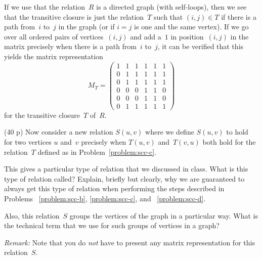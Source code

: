 \documentclass{jn-pset}
\begin{document}
\begin{problem}
\begin{solution}
    If we use that the relation~$R$ is a directed graph (with self-loops),
    then we see that the transitive closure is just the relation~$T$
    such that
    $(i, j) \in T$
    if there is a path from~$i$ to~$j$ in the graph
    (or if $i = j $ is one and the same vertex).
    If we go over all ordered pairs of vertices~$(i,j)$
    and add a~$1$ in position~$(i,j)$ in the matrix
    precisely when there is a path from~$i$ to~$j$, it can be verified that this yields the
    matrix representation
  \begin{equation}
    \label{eq:adjacency-matrix-transitive-closure}
    M_T =
    \begin{pmatrix}
       1 & 1 & 1 & 1 & 1 & 1 \\
       0 & 1 & 1 & 1 & 1 & 1 \\
       0 & 1 & 1 & 1 & 1 & 1 \\
       0 & 0 & 0 & 1 & 1 & 0 \\
       0 & 0 & 0 & 1 & 1 & 0 \\
       0 & 1 & 1 & 1 & 1 & 1 
    \end{pmatrix}
  \end{equation}
  for the transitive closure~$T$ of~$R$.
\end{solution}

  \begin{subproblem}
    {(40 p)}
    {\ignorespaces}
    \label{problem:scc-d}%
    Now consider a new relation $S(u,v)$
    where we define 
    $S(u,v)$ to hold for two vertices $u$ and~$v$ precisely when
    $T(u,v)$ and~$T(v,u)$ both hold
    for the relation~$T$ defined as in 
    Problem~\ref{problem:scc-c}.
        
    This gives a particular type of relation that we discussed in class.
    What is this type of relation called?
    Explain, briefly but clearly, why we are guaranteed to always get
    this type of relation when performing the steps described in
    Problems~%
    \ref{problem:scc-b},
    \ref{problem:scc-c},
    and~%
    \ref{problem:scc-d}.

    Also, this relation~$S$ groups the vertices of the graph in a
    particular way. What is the technical term that we use for such
    groups of vertices in a graph?    

    \smallskip
    \noindent
    \emph{Remark:}
    Note that you do \emph{not} have to present any matrix
    representation for this relation~$S$.
    

\end{subproblem}
\end{problem}
\end{document}
